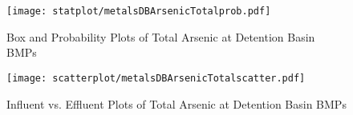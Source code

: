         \begin{figure}[hb]   %
            \centering
            \texttt{[image: statplot/metalsDBArsenicTotalprob.pdf]}
            \caption{Box and Probability Plots of Total Arsenic at Detention Basin BMPs}
        \end{figure}         %
        
        
        \begin{figure}[hb]   %
            \centering
            \texttt{[image: scatterplot/metalsDBArsenicTotalscatter.pdf]}
            \caption{Influent vs. Effluent Plots of Total Arsenic at Detention Basin BMPs}
        \end{figure}         %
        \clearpage
        